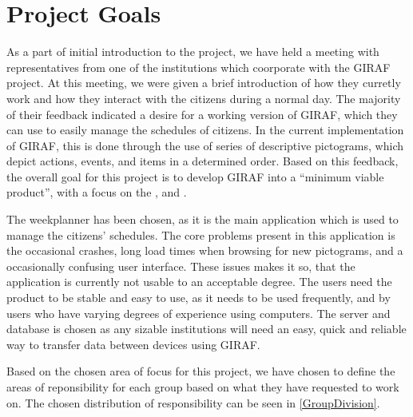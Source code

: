 \section{Project Goals}
As a part of initial introduction to the project, we have held a meeting with
representatives from one of the institutions which coorporate with the GIRAF
project. At this meeting, we were given a brief introduction of how they
curretly work and how they interact with the citizens during a normal day. The
majority of their feedback indicated a desire for a working version of GIRAF,
which they can use to easily manage the schedules of citizens. In the
current implementation of GIRAF, this is done through the use of series of
descriptive pictograms, which depict actions, events, and items in a determined
order. Based on this feedback, the overall goal for this project is to develop
GIRAF into a ``minimum viable product'', with a focus on the
,  and .\nl

The weekplanner has been chosen, as it is the main application which is used
to manage the citizens' schedules. The core problems present in this application is
the occasional crashes, long load times when browsing for new pictograms, and a
occasionally confusing user interface. These issues makes it so, that the
application is currently not usable to an acceptable degree. The users need the
product to be stable and easy to use, as it needs to be used frequently, and by
users who have varying degrees of experience using computers. The server
and database is chosen as any sizable institutions will need an easy, quick and
reliable way to transfer data between devices using GIRAF.\nl

Based on the chosen area of focus for this project, we have chosen to define the
areas of reponsibility for each group based on what they have requested to work
on. The chosen distribution of responsibility can be seen in
\autoref{GroupDivision}.

